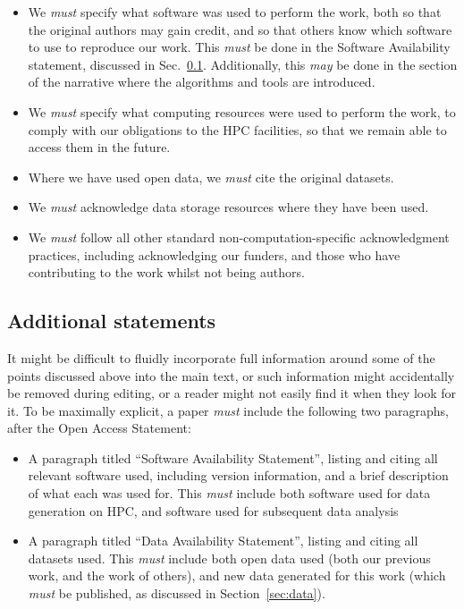 \documentclass{article}
\newcommand\rfcword[1]{\emph{#1}\xspace}
\newcommand\must{\rfcword{must}}
\newcommand\may{\rfcword{may}}
\begin{document}
\begin{itemize}
  \item
        We \must specify what software was used to perform the work,
        both so that the original authors may gain credit,
        and so that others know which software to use to reproduce our work.
        This \must be done in the Software Availability statement,
        discussed in Sec.~\ref{sec:statements}.
        Additionally,
        this \may be done
        in the section of the narrative where the algorithms and tools are introduced.
  \item
        We \must specify what computing resources were used to perform the work,
        to comply with our obligations to the HPC facilities,
        so that we remain able to access them in the future.
  \item
        Where we have used open data,
        we \must cite the original datasets.
  \item
        We \must acknowledge data storage resources where they have been used.
  \item
        We \must follow all other standard non-computation-specific acknowledgment practices,
        including acknowledging our funders,
        and those who have contributing to the work whilst not being authors.
\end{itemize}

\subsection{Additional statements}
\label{sec:statements}

It might be difficult to fluidly incorporate
full information around some of the points discussed above into the main text,
or such information might accidentally be removed during editing,
or a reader might not easily find it when they look for it.
To be maximally explicit,
a paper \must include the following two paragraphs,
after the Open Access Statement:

\begin{itemize}
  \item
        A paragraph titled ``Software Availability Statement'',
        listing and citing all relevant software used,
        including version information,
        and a brief description of what each was used for.
        This \must include both software used for data generation on HPC,
        and software used for subsequent data analysis
  \item
        A paragraph titled ``Data Availability Statement'',
        listing and citing all datasets used.
        This \must include both open data used
        (both our previous work,
        and the work of others),
        and new data generated for this work
        (which \must be published,
        as discussed in Section~\ref{sec:data}).
\end{itemize}
\end{document}
